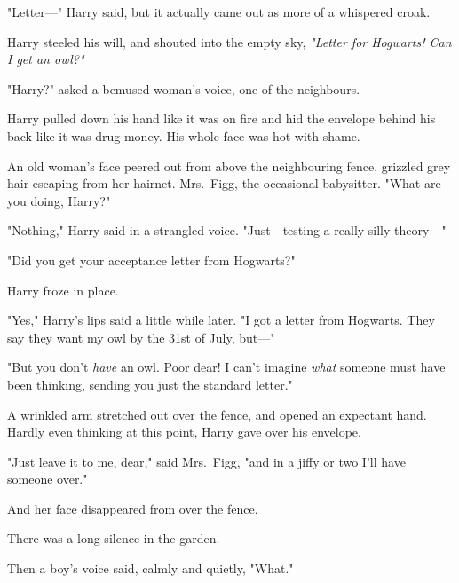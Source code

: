 "Letter\mbox{---}" Harry said, but it actually came out as more of a whispered croak.

Harry steeled his will, and shouted into the empty sky, \emph{"Letter for
Hogwarts! Can I get an owl?"}

"Harry?" asked a bemused woman's voice, one of the neighbours.

Harry pulled down his hand like it was on fire and hid the envelope behind his
back like it was drug money. His whole face was hot with shame.

An old woman's face peered out from above the neighbouring fence, grizzled grey
hair escaping from her hairnet. Mrs.~Figg, the occasional babysitter. "What are
you doing, Harry?"

"Nothing," Harry said in a strangled voice. "Just---testing a really silly
theory\mbox{---}"

"Did you get your acceptance letter from Hogwarts?"

Harry froze in place.

"Yes," Harry's lips said a little while later. "I got a letter from Hogwarts.
They say they want my owl by the 31st of July, but\mbox{---}"

"But you don't \emph{have} an owl. Poor dear! I can't imagine \emph{what}
someone must have been thinking, sending you just the standard letter."

A wrinkled arm stretched out over the fence, and opened an expectant hand.
Hardly even thinking at this point, Harry gave over his envelope.

"Just leave it to me, dear," said Mrs.~Figg, "and in a jiffy or two I'll have
someone over."

And her face disappeared from over the fence.

There was a long silence in the garden.

Then a boy's voice said, calmly and quietly, "What."
